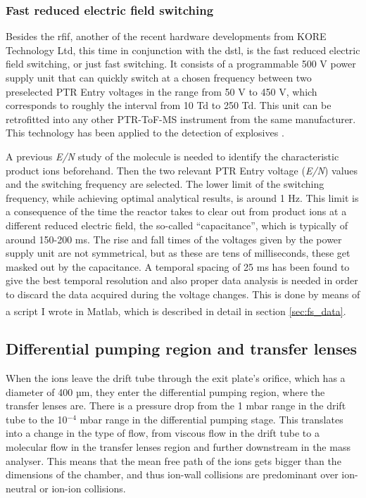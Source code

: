 \subsubsection{Fast reduced electric field  switching}\label{section:fs}
Besides the \acrshort{rfif}, another of the recent hardware developments from KORE Technology Ltd, this time in conjunction with the \acrfull{dstl}, is the fast reduced electric field switching, or just fast switching.
It consists of a  programmable 500 V power supply unit that can quickly switch at a chosen frequency between two preselected PTR Entry voltages  in the range from 50 V to 450 V, which corresponds  to roughly the interval from 10 Td to 250 Td.  This unit can be retrofitted into any other PTR-ToF-MS instrument from the same manufacturer.
This technology has been applied to the detection of explosives \cite{doi:10.1021/acs.analchem.7b05211}.


A previous \textit{E/N} study of the molecule is needed to identify  the characteristic product ions beforehand. Then the two relevant PTR Entry voltage (\textit{E/N}) values and the switching frequency are selected.
The lower limit of the switching frequency, while achieving optimal analytical results, is around 1 Hz.
This limit is a consequence of the time the reactor takes to clear out from product ions at a different reduced electric field, the so-called ``capacitance'', which is typically of around 150-200 ms.
The rise and fall times of the voltages given by the power supply unit are not symmetrical, but as these are tens of milliseconds, these get masked out by the capacitance.
A temporal spacing of 25 ms has been found to give the best temporal resolution and  also proper data analysis is needed in order to discard the data acquired during the voltage changes.
This is done by means of a script I wrote in Matlab\textsuperscript{\textregistered}, which is described in detail in  section \ref{sec:fs_data}.













\subsection{Differential pumping region and transfer lenses}
When the ions leave the drift tube through the exit plate's orifice, which has a diameter of 400 µm, they enter the differential pumping region, where the transfer lenses are. There is a pressure drop from the 1 mbar range in the drift tube to the 10$^{-4}$ mbar range in the differential pumping stage. This translates into a change in the type of flow, from viscous flow in the drift tube to a molecular flow in the transfer lenses region and further downstream in the mass analyser. This means that the mean free path of the ions gets bigger than the dimensions of the chamber,
and thus ion-wall collisions are predominant over ion-neutral or ion-ion collisions.

